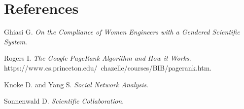 \documentclass{article}
\begin{document}
\section*{References}

\noindent
Ghiasi G. \textit{On the Compliance of Women Engineers with a Gendered Scientific System}.

\noindent Rogers I. \textit{The Google PageRank Algorithm and How it Works}.\\https://www.cs.princeton.edu/~chazelle/courses/BIB/pagerank.htm.

\noindent
Knoke D. and Yang S. \textit{Social Network Analysis}.

\noindent
Sonnenwald D. \textit{Scientific Collaboration}.
\end{document}
